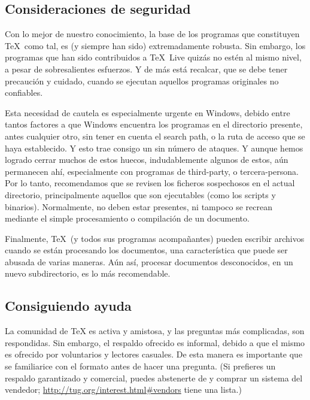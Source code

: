 \documentclass{article}
\begin{document}
\subsection{Consideraciones de seguridad}
\label{sec:security}

Con lo mejor de nuestro conocimiento, la base de los programas
que constituyen  \TeX\ como tal, es (y siempre han sido)
extremadamente robusta. Sin embargo, los programas que han sido
contribuidos a \TeX\ Live quizás no estén al mismo nivel, a
pesar de sobresalientes esfuerzos. Y de más está recalcar, que
se debe tener precaución y cuidado, cuando se ejecutan
aquellos programas originales no confiables. 

Esta necesidad de cautela es especialmente urgente en Windows, debido
entre tantos factores a que Windows encuentra los programas en el
directorio presente, antes cualquier otro, sin tener en cuenta el
search path, o la ruta de acceso que se haya establecido. Y esto trae
consigo un sin número de ataques. Y aunque hemos logrado cerrar muchos
de estos huecos, indudablemente algunos de estos, aún permanecen ahí,
especialmente con programas de third-party, o tercera-persona. Por lo
tanto, recomendamos que se revisen los ficheros sospechosos en el actual
directorio, principalmente aquellos que son ejecutables (como los
scripts y binarios). Normalmente, no deben estar presentes, ni tampoco
se recrean mediante el simple procesamiento o compilación de un
documento. 
  
Finalmente, \TeX\ (y todos sus programas acompañantes) pueden escribir
archivos cuando se están procesando los documentos, una característica
que puede ser abusada de varias maneras. Aún así, procesar documentos
desconocidos, en un nuevo subdirectorio, es lo más recomendable. 

\subsection{Consiguiendo ayuda}
\label{sec:help}

La comunidad de \TeX{} es activa y amistosa, y las preguntas más
complicadas, son respondidas. Sin embargo, el respaldo ofrecido es
informal, debido a que el mismo es ofrecido por voluntarios y lectores
casuales. De esta manera es importante que se familiarice con el
formato antes de hacer una pregunta. (Si prefieres un respaldo
garantizado y comercial, puedes abstenerte de \TL{} y comprar un
sistema del vendedor; \url{http://tug.org/interest.html#vendors} tiene
una lista.)
\end{document}
